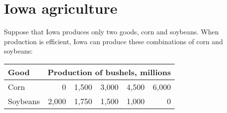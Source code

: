\documentclass{assignment}
\date{Wednesday 21 September 2022}
\begin{document}
\RaggedRight

\beginsolutions{}

\section*{Iowa agriculture}

Suppose that Iowa produces only two goods, corn and soybeans. When production is efficient, Iowa can produce these combinations of corn and soybeans:

{\footnotesize\begin{tabular}{lrrrrr}
\toprule
Good & \multicolumn{5}{c}{Production of bushels, millions} \\
\midrule
Corn     & 0 & 1,500 & 3,000 & 4,500 & 6,000 \\
Soybeans & 2,000 & 1,750 & 1,500 & 1,000 & 0 \\
\bottomrule
\end{tabular}}
\end{document}
